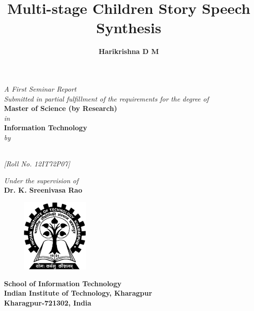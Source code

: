 

\title{\fontsize{16pt}{19.2pt}\selectfont\bf{ Multi-stage Children Story Speech Synthesis }}
\date{}
\maketitle
\thispagestyle{empty}
\begin{center}
\vspace*{-8mm}
\textit{A First Seminar Report\\Submitted in partial fulfillment of the requirements for the degree of \\}
\vspace*{6mm}
{\fontsize{14pt}{16.8pt}\selectfont\textbf{Master of Science (by Research)}} \\ \vspace*{3mm}
{\fontsize{14pt}{16.8pt}\selectfont\textit{in}} \\
\vspace*{3mm}
%
{\fontsize{14pt}{16.8pt}\selectfont\textbf{Information Technology}} \\

\vspace*{2mm}
{\fontsize{14pt}{16.8pt}\selectfont\textit{by}} \\
\vspace*{3mm}

\author{\fontsize{14pt}{16.8pt}\selectfont\textbf{Harikrishna D M}}\\
\vspace*{2mm}
{\fontsize{12pt}{14.4pt}\selectfont\textit{[Roll No. 12IT72P07]}} \\
\vspace*{3mm}

\vspace*{4mm}\fontsize{14pt}{16.8pt}\selectfont\textit{Under the supervision of} \\
\vspace*{2mm}\fontsize{14pt}{16.8pt}\selectfont\textbf{Dr. K. Sreenivasa Rao} \\
\vspace*{8mm}
\begin{figure}[!ht]
\centering
\includegraphics[height=36.068mm,width=33.274mm]{figures/iitlogo.eps}
\end{figure}
\vspace*{3mm}
\fontsize{14pt}{16.8pt}\selectfont\textbf{School of Information Technology \\
\vspace*{2mm} Indian Institute of Technology, Kharagpur} \\
\vspace*{2mm}
\fontsize{14pt}{16.8pt}\selectfont\textbf{Kharagpur-721302, India}
\end{center}
